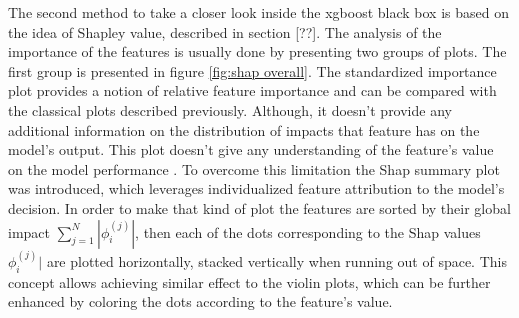 The second method to take a closer look inside the xgboost black box is based on the idea of Shapley value, described in section [??]. The analysis of the importance of the features is usually done by presenting two groups of plots. The first group is presented in figure \ref{fig:shap overall}. The standardized importance plot provides a notion of relative feature importance and can be compared with the classical plots described previously. Although, it doesn't provide any additional information on the distribution of impacts that feature has on the model's output. This plot doesn't give any understanding of the feature's value on the model performance  \cite{Shap2}. To overcome this limitation the Shap summary plot was introduced, which leverages individualized feature attribution to the model's decision. In order to make that kind of plot the features are sorted by their global impact $\sum_{j=1}^{N}|\phi_i^{(j)}|$, then each of the dots corresponding to the Shap values $\phi_i^{(j)}|$ are plotted horizontally, stacked vertically when running out of space. This concept allows achieving similar effect to the violin plots, which can be further enhanced by coloring the dots according to the feature's value. 

